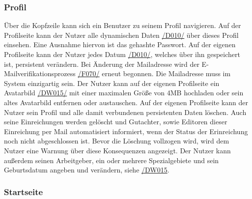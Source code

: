 \subsubsection{Profil} \label{nut:profil}
\begin{description}
     Über die Kopfzeile kann sich ein Benutzer zu seinem Profil navigieren.
     Auf der Profilseite kann der Nutzer alle dynamischen Daten \hyperref[d010]{/D010/} über dieses Profil einsehen.
    Eine Ausnahme hiervon ist das gehashte Passwort.
     Auf der eigenen Profilseite kann der Nutzer jedes Datum \hyperref[d010]{/D010/},
    welches über ihn gespeichert ist, persistent verändern.
     Bei Änderung der Mailadresse wird der E-Mailverifikationsprozess \hyperref[funkt:070]{/F070/} erneut
    begonnen. Die Mailadresse muss im System einzigartig sein.
     Der Nutzer kann auf der eigenen Profilseite ein Avatarbild \hyperref[d015]{/DW015/} mit einer maximalen
    Größe von 4MB hochladen oder sein altes Avatarbild entfernen oder austauschen.
     Auf der eigenen Profilseite kann der Nutzer sein Profil und alle damit verbundenen persistenten
    Daten löschen. Auch seine Einreichungen werden gelöscht und Gutachter, sowie Editoren dieser
    Einreichung per Mail automatisiert informiert, wenn der Status der Erinreichung noch nicht abgeschlossen ist.
    Bevor die Löschung vollzogen wird, wird dem Nutzer eine Warnung über diese Konsequenzen angezeigt.
     Der Nutzer kann außerdem seinen Arbeitgeber, ein oder mehrere Spezialgebiete
    und sein Geburtsdatum angeben und verändern, siehe \hyperref[d015]{/DW015}.
\end{description}

\subsubsection{Startseite} \label{nut:start}

